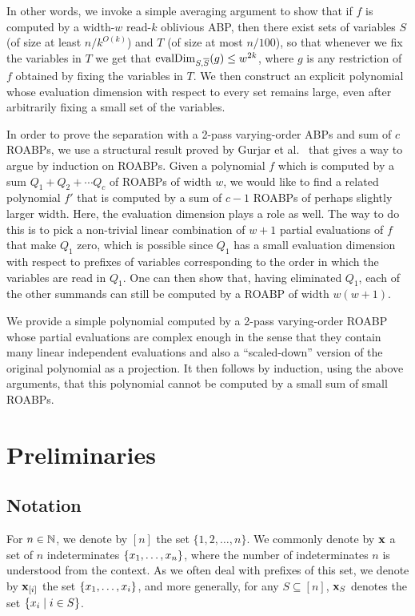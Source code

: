 \documentclass[11pt]{article}
\newcommand{\exi}{\vecx_{[i]}}
\begin{document}
In other words, we invoke a simple averaging argument to show that if $f$ is computed by a width-$w$ read-$k$ oblivious ABP, then there exist sets of variables $S$ (of size at least $n/k^{O(k)}$) and $T$ (of size at most $n/100$), so that whenever we fix the variables in $T$ we get that $\operatorname{evalDim}_{S, \overline{S}} (g) \le w^{2k}$, where $g$ is any restriction of $f$ obtained by fixing the variables in $T$. We then construct an explicit polynomial whose evaluation dimension with respect to every set remains large, even after arbitrarily fixing a small set of the variables.

\medskip

In order to prove the separation with a 2-pass varying-order ABPs and sum of $c$ ROABPs, we use a structural result proved by Gurjar et al.\ \cite{GKST15} that gives a way to argue by induction on ROABPs. Given a polynomial $f$ which is computed by a sum $Q_1 + Q_2 + \cdots Q_c$ of ROABPs of width $w$, we would like to find a related polynomial $f'$ that is computed by a sum of $c-1$ ROABPs of perhaps slightly larger width. Here, the evaluation dimension plays a role as well. The way to do this is to pick a non-trivial linear combination of $w+1$ partial evaluations of $f$ that make $Q_1$ zero, which is possible since $Q_1$ has a small evaluation dimension with respect to prefixes of variables corresponding to the order in which the variables are read in $Q_1$. One can then show that, having eliminated $Q_1$, each of the other summands can still be computed by a ROABP of width $w(w+1)$.


We provide a simple polynomial computed by a 2-pass varying-order ROABP whose partial evaluations are complex enough in the sense that they contain many linear independent evaluations and also a ``scaled-down'' version of the original polynomial as a projection. It then follows by induction, using the above arguments, that this polynomial cannot be computed by a small sum of small ROABPs.



\section{Preliminaries}

\subsection{Notation}
For $n \in \N$, we denote by $[n]$ the set $\{1, 2, \ldots, n\}$. We commonly denote by $\mathbf{x}$ a set of $n$ indeterminates $\left\{ x_1, \ldots, x_n \right\}$, where the number of indeterminates $n$ is understood from the context. As we often deal with prefixes of this set, we denote by $\exi$ the set $\left\{ x_1, \ldots, x_i \right\}$, and more generally, for any $S \subseteq [n]$, $\mathbf{x}_S$ denotes the set $\left\{ x_i \mid i \in S \right\}$.
\end{document}
